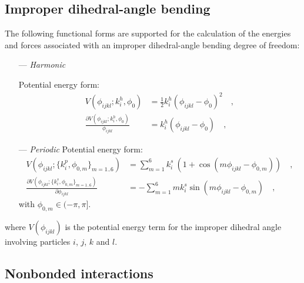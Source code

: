 \documentclass[10pt,a4paper,openany]{memoir}
\numberwithin{equation}{section}
\begin{document}
\subsection{Improper dihedral-angle bending}
\label{sec:improper-terms}

The following functional forms are supported for the calculation of
the energies and forces associated with an improper dihedral-angle
bending degree of freedom:\cite{GROMOS-doc,GROMACS-doc}

\begin{itemize}
\item[---] \textit{Harmonic}
  \par
  Potential energy form:  
\begin{align}
  \label{eq:improper-harmonic-energy}
  V(\phi_{ijkl}; k_i^h, \phi_0) & =  \frac{1}{2} k_i^h (\phi_{ijkl} - \phi_0)^2 \quad , \\ \nonumber
  \frac{\partial V(\phi_{ijkl}; k_i^h, \phi_0)}{\phi_{ijkl}} & = k_i^h (\phi_{ijkl} - \phi_0) \quad ,
\end{align}
\item [---] \textit{Periodic}
  Potential energy form:
  \begin{align}
    \label{eq:improper-periodic-energy}
    V(\phi_{ijkl} ; \{k_{i}^p, \phi_{0,m}\}_{m=1..6}) & = \sum_{m=1}^{6} k_{i}^s\ (1 + \cos{( m \phi_{ijkl} - \phi_{0,m})})\quad , \\ \nonumber
    \frac{\partial V(\phi_{ijkl} ; \{k_{i}^s, \phi_{0,m}\}_{m=1..6})}{\partial \phi_{ijkl}} & = -\sum_{m=1}^{6} m k_{i}^s \sin{(m \phi_{ijkl} - \phi_{0,m})}\quad ,
  \end{align}
  with $\phi_{0,m} \in (-\pi, \pi]$.  
 \end{itemize}
 where $V(\phi_{ijkl})$ is the potential energy term for the improper dihedral angle involving particles $i$, $j$, $k$ and $l$.

\subsection{Nonbonded interactions}
\label{sec:nonbonded}
\end{document}
